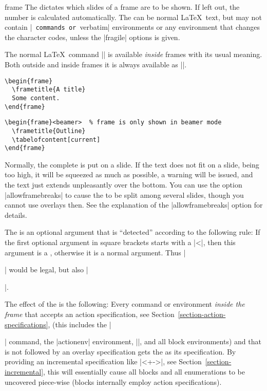\begin{environment}{{frame}%
    }
  The  dictates which slides of a frame are
  to be shown. If left out, the number is calculated automatically.
  The  can be normal \LaTeX\ text, but may not contain
  |\verb| commands or |verbatim| environments or any environment that
  changes the character codes, unless the |fragile| options
  is given.
 
  The normal \LaTeX\ command |\frame| is available \emph{inside}
  frames with its usual meaning. Both outside and inside frames it is
  always available as {\color{red!75!black}|\framelatex|}. 
 
  \example
\begin{verbatim}
\begin{frame}
  \frametitle{A title}
  Some content.
\end{frame}
\end{verbatim}
  
  \example
\begin{verbatim}
\begin{frame}<beamer>  % frame is only shown in beamer mode
  \frametitle{Outline}
  \tabelofcontent[current]
\end{frame}
\end{verbatim}

  Normally, the complete  is put on a slide. If
  the text does not fit on a slide, being too high, it will be
  squeezed as much as possible, a warning will be issued, and the text
  just extends unpleasantly over the bottom. You can use the option
  |allowframebreaks| to cause the  to be split among several
  slides, though you cannot use overlays then. See the explanation of
  the |allowframebreaks| option for details. 
  
  The  is an optional argument
  that is ``detected'' according to the following rule: If the first
  optional argument in square brackets starts with a |<|, then this
  argument is a , otherwise it is
  a normal  argument. Thus |\begin{frame}[<+->][plain]| would
  be legal, but also |\begin{frame}[plain]|.

  The effect of the  is the
  following: Every command or environment \emph{inside the frame} that
  accepts an action specification, see
  Section~\ref{section-action-specifications}, (this includes the
  |\item| command, the |actionenv| environment, |\action|, and all
  block environments) and that is not followed by 
  an overlay specification gets the  as its specification. By providing an incremental
  specification like |<+->|, see Section~\ref{section-incremental},
  this will essentially cause all blocks and all enumerations to be
  uncovered piece-wise (blocks internally employ action
  specifications).
  

\end{frame}
\end{frame}
\end{environment}
